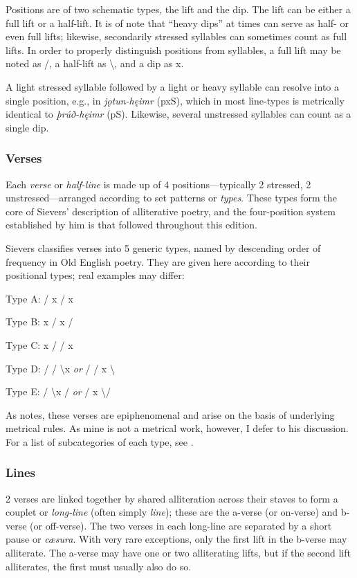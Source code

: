     Positions are of two schematic types, the lift and the dip.  The lift can be either a full lift or a half-lift.  It is of note that “heavy dips” at times can serve as half- or even full lifts; likewise, secondarily stressed syllables can sometimes count as full lifts.  In order to properly distinguish positions from syllables, a full lift may be noted as /, a half-lift as \textbackslash, and a dip as x.

    A light stressed syllable followed by a light or heavy syllable can resolve into a single position, e.g., in \emph{jǫtun-hęimr} (pxS), which in most line-types is metrically identical to \emph{þrúð-hęimr} (pS).  Likewise, several unstressed syllables can count as a single dip.

    \subsubsection{Verses}

    Each \emph{verse} or \emph{half-line} is made up of 4 positions---typically 2 stressed, 2 unstressed---arranged according to set patterns or \emph{types}.  These types form the core of Sievers’ description of alliterative poetry, and the four-position system established by him is that followed throughout this edition.

    Sievers classifies verses into 5 generic types, named by descending order of frequency in Old English poetry.  They are given here according to their positional types; real examples may differ:

    Type A: / x / x

    Type B: x / x /

    Type C: x / / x

    Type D: / / \textbackslash x \emph{or} / / x \textbackslash

    Type E: / \textbackslash x / \emph{or} / x \textbackslash /

    As \textcite[240]{Goering2023} notes, these verses are epiphenomenal and arise on the basis of underlying metrical rules.  As mine is not a metrical work, however, I defer to his discussion.  For a list of subcategories of each type, see \textcite[240--242]{Goering2023Prosody}.

    \subsubsection{Lines}

    2 verses are linked together by shared alliteration across their staves to form a couplet or \emph{long-line} (often simply \emph{line}); these are the a-verse (or on-verse) and b-verse (or off-verse).  The two verses in each long-line are separated by a short pause or \emph{cæsura}.  With very rare exceptions, only the first lift in the b-verse may alliterate.  The a-verse may have one or two alliterating lifts, but if the second lift alliterates, the first must usually also do so.

